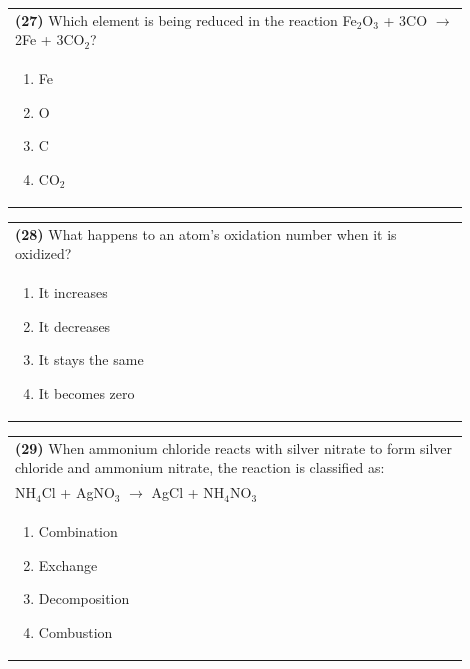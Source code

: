 \documentclass{article}
\begin{document}
\noindent\begin{tabular}{|p{0.9\linewidth}|}
\hline
\textbf{(27)} Which element is being reduced in the reaction Fe$_2$O$_3$ + 3CO $\rightarrow$ 2Fe + 3CO$_2$?\\[0.2cm]
\begin{minipage}[t]{0.85\linewidth}
\begin{enumerate}[label=\alph*.]
\item Fe
\item O
\item C
\item CO$_2$
\end{enumerate}
\end{minipage}\\[0.2cm]
\hline
\end{tabular}

\noindent\begin{tabular}{|p{0.9\linewidth}|}
\hline
\textbf{(28)} What happens to an atom's oxidation number when it is oxidized?\\[0.2cm]
\begin{minipage}[t]{0.85\linewidth}
\begin{enumerate}[label=\alph*.]
\item It increases
\item It decreases
\item It stays the same
\item It becomes zero
\end{enumerate}
\end{minipage}\\[0.2cm]
\hline
\end{tabular}
\newpage

\noindent\begin{tabular}{|p{0.9\linewidth}|}
\hline
\textbf{(29)} When ammonium chloride reacts with silver nitrate to form silver chloride and ammonium nitrate, the reaction is classified as:\\[0.2cm]
NH$_4$Cl + AgNO$_3$ $\rightarrow$ AgCl + NH$_4$NO$_3$\\[0.2cm]
\begin{minipage}[t]{0.85\linewidth}
\begin{enumerate}[label=\alph*.]
\item Combination
\item Exchange
\item Decomposition
\item Combustion
\end{enumerate}
\end{minipage}\\[0.2cm]
\hline
\end{tabular}
\end{document}
